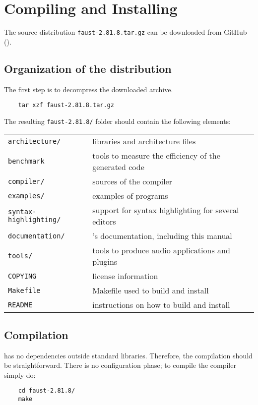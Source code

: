 \chapter{Compiling and Installing \faust}
\label{install}

The \faust source distribution \lstinline'faust-2.81.8.tar.gz' can be downloaded from GitHub ().

\section{Organization of the distribution}
The first step is to decompress the downloaded archive. 
\begin{lstlisting}
	tar xzf faust-2.81.8.tar.gz
\end{lstlisting}

The resulting \lstinline'faust-2.81.8/' folder should contain the following elements:

\begin{tabular}{ll}
	\lstinline'architecture/' 		&\faust libraries and architecture files\\
	\lstinline'benchmark'			&tools to measure the efficiency of the generated code\\
	\lstinline'compiler/'			&sources of the \faust compiler\\
	\lstinline'examples/'			&examples of \faust programs\\
	\lstinline'syntax-highlighting/'&	support for syntax highlighting for several editors\\
	\lstinline'documentation/' 		&\faust's documentation, including this manual\\
	\lstinline'tools/'				&tools to produce audio applications and plugins\\
	\lstinline'COPYING'			&license information\\
	\lstinline'Makefile'			&Makefile used to build and install \faust\\
	\lstinline'README'			&instructions on how to build and install \faust
\end{tabular}

\section{Compilation}
\faust has no dependencies outside standard libraries. Therefore, the compilation should be straightforward. There is no configuration phase; to compile the \faust compiler simply do:
\begin{lstlisting}
	cd faust-2.81.8/
	make
\end{lstlisting}

